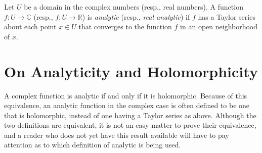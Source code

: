 \documentclass[12pt]{article}
\begin{document}
Let $U$ be a domain in the complex numbers (resp., real numbers). A function $f: U \longrightarrow \mathbb{C}$ (resp., $f: U \longrightarrow \mathbb{R}$) is {\em analytic} (resp., {\em real analytic}) if $f$ has a Taylor series about each point $x \in U$ that converges to the function $f$ in an open neighborhood of $x$.

\section{On Analyticity and Holomorphicity}

A complex function is analytic if and only if it is holomorphic. Because of this equivalence, an analytic function in the complex case is often defined to be one that is holomorphic, instead of one having a Taylor series as above. Although the two definitions are equivalent, it is not an easy matter to prove their equivalence, and a reader who does not yet have this result available will have to pay attention as to which definition of analytic is being used.
\end{document}
